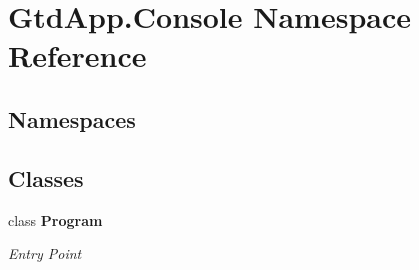\section{Gtd\+App.\+Console Namespace Reference}
\label{namespace_gtd_app_1_1_console}
\subsection*{Namespaces}
\begin{DoxyCompactItemize}
\end{DoxyCompactItemize}
\subsection*{Classes}
\begin{DoxyCompactItemize}
\item 
class \textbf{ Program}
\begin{DoxyCompactList}\small\item\em Entry Point \end{DoxyCompactList}\end{DoxyCompactItemize}
